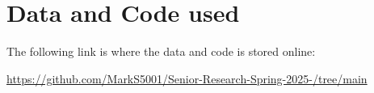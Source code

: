 \chapter{Data and Code used} \label{chap: data code}

The following link is where the data and code is stored online:

\url{https://github.com/MarkS5001/Senior-Research-Spring-2025-/tree/main}








